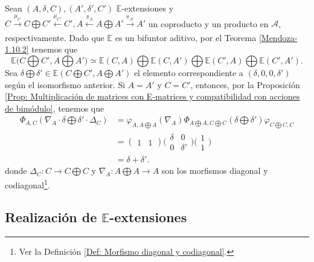 \documentclass[tesis]{subfiles}
\begin{document}
\begin{Obs}\cite[Definition 2.6]{NakaokaPalu}\label{Def: Suma de E-extensiones}
    Sean $(A,\delta,C), (A',\delta',C')$ $\mathbb{E}$-extensiones y $C\xrightarrow[]{\mu_C}C\bigoplus C'\xleftarrow[]{\mu_{C'}}C', A\xleftarrow[]{\pi_A}A\bigoplus A'\xrightarrow[]{\pi_{A'}}A'$ un coproducto y un producto en $\mathscr{A}$, respectivamente. Dado que $\mathbb{E}$ es un bifuntor aditivo, por el Teorema \ref{Mendoza-1.10.2} tenemos que
    \[
        \mathbb{E}\big(C\bigoplus C',A\bigoplus A'\big) \simeq \mathbb{E}(C,A)\bigoplus \mathbb{E}(C,A')\bigoplus \mathbb{E}(C',A)\bigoplus \mathbb{E}(C',A').
    \] 
    Sea $\delta\bigoplus\delta'\in\mathbb{E}(C\bigoplus C',A\bigoplus A')$ el elemento correspondiente a $(\delta,0,0,\delta')$ según el isomorfismo anterior. Si $A=A'$ y $C=C'$, entonces, por la Proposición \ref{Prop: Multiplicación de matrices con E-matrices y compatibilidad con acciones de bimódulo}, tenemos que
    \begin{align*}
        \Phi_{A,C}(\nabla_A\cdot\delta\bigoplus\delta'\cdot\Delta_C) &= \varphi_{A,A\bigoplus A}(\nabla_A)\Phi_{A\bigoplus A,C\bigoplus C}(\delta\bigoplus\delta')\varphi_{C\bigoplus C,C} \\
                                                                    &= (\begin{smallmatrix} 1 &1 \end{smallmatrix}) \big(\begin{smallmatrix} \delta &0 \\ 0 &\delta' \end{smallmatrix}\big) \big(\begin{smallmatrix} 1 \\ 1 \end{smallmatrix}\big) \\
                                                                    &= \delta + \delta'.
    \end{align*}
    donde $\Delta_C:C\to C\bigoplus C$ y $\nabla_A:A\bigoplus A\to A$ son los morfismos diagonal y codiagonal\footnote{Ver la Definición \ref{Def: Morfismo diagonal y codiagonal}.}.
\end{Obs}

\subsection*{Realización de $\mathbb{E}$-extensiones} \label{Ssec: Realización de E-extensiones}
\end{document}

